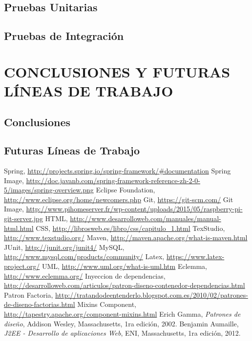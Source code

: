 \documentclass[12pt, a4paper, twoside]{book}
\begin{document}
	\section{Pruebas Unitarias}

	\section{Pruebas de Integración}
	
	\chapter{CONCLUSIONES Y FUTURAS LÍNEAS DE TRABAJO}
	\section{Conclusiones}
	
	\section{Futuras Líneas de Trabajo}
	
	\renewcommand{\bibname}{Enlaces de interés}
	\begin{thebibliography}{99}
		Spring, \url{http://projects.spring.io/spring-framework/\#documentation}
		Spring Image,
		\url{http://doc.javanb.com/spring-framework-reference-zh-2-0-5/images/spring-overview.png}
		Eclipse Foundation, \url{http://www.eclipse.org/home/newcomers.php}
		Git, \url{https://git-scm.com/}
		Git Image, \url{http://www.pihomeserver.fr/wp-content/uploads/2015/05/raspberry-pi-git-server.jpg}
		HTML, \url{http://www.desarrolloweb.com/manuales/manual-html.html}
		CSS, \url{http://librosweb.es/libro/css/capitulo\_1.html}
		TexStudio, \url{http://www.texstudio.org/}
		Maven, \url{http://maven.apache.org/what-is-maven.html}
		JUnit, \url{http://junit.org/junit4/}
		MySQL, \url{http://www.mysql.com/products/community/}
		Latex, \url{https://www.latex-project.org/}
		UML, \url{http://www.uml.org/what-is-uml.htm}
		Eclemma, \url{http://www.eclemma.org/}
		Inyeccion de dependencias, \url{http://desarrolloweb.com/articulos/patron-diseno-contenedor-dependencias.html}
		Patron Factoria, \url{http://tratandodeentenderlo.blogspot.com.es/2010/02/patrones-de-diseno-factorias.html}
		Mixins Component,
		\url{http://tapestry.apache.org/component-mixins.html}
		Erich Gamma,
		\emph{Patrones de diseño},
		Addison Wesley, Massachusetts,
		1ra edición,
		2002.
		Benjamin Aumaille,
		\emph{J2EE - Desarrollo de aplicaciones Web},
		ENI, Massachusetts,
		1ra edición,
		2012.
	\end{thebibliography}
\end{document}
